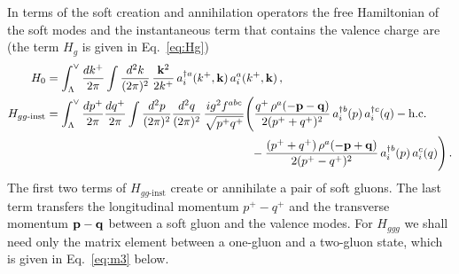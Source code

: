 In terms of the soft creation and annihilation operators the free Hamiltonian of the soft modes and the instantaneous term that contains the valence charge are (the term $H_g$ is given in Eq.~\eqref{eq:Hg})
\begin{align}
H_0&=\int_\Lambda^\vee\frac{dk^+}{2\pi}\int\frac{d^2k}{(2\pi)^2}\,\frac{\v k^2}{2k^+}\,a^{\dagger a}_i(k^+,\v k)\,a^a_i(k^+,\v k)\,,\label{eq:H0soft}\\
H_{gg\text{-inst}}&=\int_\Lambda^\vee\frac{dp^+}{2\pi}\frac{dq^+}{2\pi}\int\frac{d^2p}{(2\pi)^2}\frac{d^2q}{(2\pi)^2}\,\frac{ig^2f^{abc}}{\sqrt{p^+q^+}}
\Bigg(\frac{q^+\,\rho^a(-\v p-\v q)}{2(p^++q^+)^2}\,a^{\dagger b}_i(p)\,a^{\dagger c}_i(q)-{\rm h.c.}\notag\\
&\hspace{6.2cm}-\frac{(p^++q^+)\,\rho^a(-\v p+\v q)}{2(p^+-q^+)^2}\,a^{\dagger b}_i(p)\,a^c_i(q)\Bigg)\,.\label{eq:Hinst}
\end{align}
The first two terms of $H_{gg\text{-inst}}$ create or annihilate a pair of soft gluons. The last term transfers the longitudinal momentum $p^+-q^+$ and the transverse momentum $\mathbf{p}-\mathbf{q}$ between a soft gluon and the valence modes. For $H_{ggg}$ we shall need only the matrix element between a one-gluon and a two-gluon state, which is given in Eq.~\eqref{eq:m3} below.


